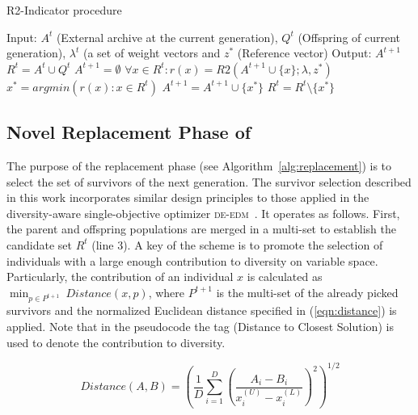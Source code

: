 \begin{algorithm}[!t]
        \caption{R2-Indicator procedure}
        \begin{small}
\begin{algorithmic}[1]
	\STATE Input: $A^t$ (External archive at the current generation), $Q^t$ (Offspring of current generation), $\lambda^t$ (a set of weight vectors and $z^*$ (Reference vector)
	\STATE Output: $A^{t+1}$
	\STATE $R^t= A^t \cup Q^t$
	\STATE $A^{t+1} = \emptyset$
	\STATE $\forall x \in R^t : r(x) = R2(A^{t+1} \cup \{x\}; \lambda, z^*)$
	\STATE $x^* = argmin(r(x):x \in R^t)$ 
	\STATE $A^{t+1} = A^{t+1} \cup \{x^*\}$
	\STATE $R^t = R^t \setminus \{ x^* \}$ 
  	\ENDWHILE
        \end{algorithmic}
        \end{small}
\label{alg:r2_Indicator}
\end{algorithm}



%
\subsection{Novel Replacement Phase of \AVSDMOEAD{} }

The purpose of the replacement phase (see Algorithm~\ref{alg:replacement}) is to select the set of survivors of the next generation.
%
The survivor selection described in this work incorporates similar design principles to those applied in 
the diversity-aware single-objective optimizer \textsc{de-edm}~\cite{castillo2019differential}.
%
It operates as follows.
%
First, the parent and offspring populations are merged in a multi-set to establish the candidate set $R^t$ (line 3).
%
A key of the scheme is to promote the selection of individuals with a large enough contribution to diversity
on variable space.
%
Particularly, the contribution of an individual $x$ is calculated as $\displaystyle{\min_{p \in P^{t+1}}\ Distance(x, p)}$, 
where $P^{t+1}$ is the multi-set of the already picked survivors and the normalized Euclidean distance
specified in (\ref{eqn:distance}) is applied.
%
Note that in the pseudocode the tag \DCS{} (Distance to Closest Solution) is used to denote the contribution to diversity.

\begin{equation}\label{eqn:distance}
Distance(A, B) =   \left ( \frac{1}{D}  \sum_{i=1}^D \left ( \frac{A_i - B_i}{x_i^{(U)} - x_i^{(L)}} \right )^2  \right)^{1/2}
\end{equation}

